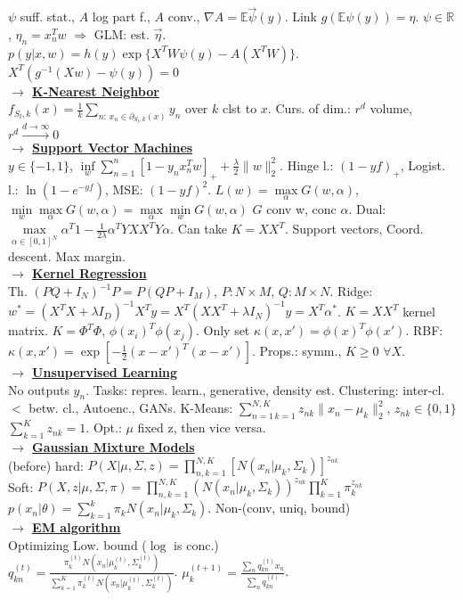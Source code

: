 \documentclass[12pt]{article}
\newcommand{\mytitle}[1]{ {\bf $\rightarrow$ \underline{#1}}\\}
\begin{document}
\begin{multicols*}{2}
$\psi$ suff. stat., $A$ log part f.,
$A$ conv., $\nabla A=\mathbb{E}\vec{\psi}(y)$. Link $g(\mathbb{E}\psi(y))=\eta$.
$\psi\in \mathbb{R}$, $\eta_n=x_n^Tw$ $\Rightarrow$ GLM: est. $\vec{\eta}$.
$p(y|x,w)=h(y)\exp\{X^TW\psi(y)-A(X^TW)\}$.
$X^T(g^{-1}(Xw)-\psi(y))=0$\\
\mytitle{K-Nearest Neighbor}
$f_{S_t,k}(x)=\frac{1}{k}\sum\limits_{n\colon\,x_n\in \partial_{S_t,k}(x)}y_n$ over $k$ clst to $x$.
Curs. of dim.: $r^d$ volume, $r^d\overset{d\to\infty}\to 0$\\
\mytitle{Support Vector Machines}
$y\in\{-1,1\}$, $\inf\limits_w\sum\limits_{n=1}^n\left[1-y_nx_n^Tw\right]_++\frac{\lambda}{2}\|w\|^2_2$.
Hinge l.: $(1-yf)_+$, Logist. l.: $\ln(1-e^{-yf})$, MSE: $(1-yf)^2$.
$L(w)=\max\limits_\alpha G(w,\alpha)$, $\min\limits_w\max\limits_\alpha G(w,\alpha)=\max\limits_\alpha\min\limits_w G(w,\alpha)$
$G$ conv w, conc $\alpha$.
Dual: $\max\limits_{\alpha\in[0,1]^N}\alpha^T1-\frac{1}{2\lambda}\alpha^TYXX^TY\alpha$.
Can take $K=XX^T$. Support vectors, Coord. descent. Max margin.\\
\mytitle{Kernel Regression}
Th. $(PQ+I_N)^{-1}P=P(QP+I_M)$, $P\colon N\times M$, $Q\colon M\times N$.
Ridge: $w^*=(X^TX+\lambda I_D)^{-1}X^Ty=X^T(XX^T+\lambda I_N)^{-1}y=X^T\alpha^*$.
$K=XX^T$ kernel matrix. $K=\Phi^T\Phi$, $\phi(x_i)^T\phi(x_j)$.
Only set $\kappa(x,x')=\phi(x)^T\phi(x')$.
RBF: $\kappa(x,x')=\exp\left[-\frac{1}{2}(x-x')^T(x-x')\right]$.
Props.: symm., $K\geqslant 0$ $\forall X$.\\
\mytitle{Unsupervised Learning}
No outputs $y_n$. Tasks: repres. learn., generative, density est.
Clustering: inter-cl. $<$ betw. cl., Autoenc., GANs.
K-Means: $\sum\limits_{n=1\,k=1}^{N,K}z_{nk}\|x_n-\mu_k\|_2^2$, $z_{nk}\in\{0,1\}$
$\sum\limits_{k=1}^Kz_{nk}=1$. Opt.: $\mu$ fixed z, then vice versa.\\
\mytitle{Gaussian Mixture Models}
(before) hard: $P(X|\mu,\Sigma,z)=\prod\limits_{n,k=1}^{N,K}\left[N(x_n|\mu_k,\Sigma_k)\right]^{z_{nk}}$\\
Soft: $P(X,z|\mu,\Sigma,\pi)=\prod\limits_{n,k=1}^{N,K}(N(x_n|\mu_k,\Sigma_k))^{z_{nk}}\prod\limits_{k=1}^K\pi_k^{z_{nk}}$\\
$p(x_n|\theta)=\sum\limits_{k=1}^k\pi_kN(x_n|\mu_k,\Sigma_k)$.
Non-(conv, uniq, bound)\\
\mytitle{EM algorithm}
Optimizing Low. bound ($\log$ is conc.)\\
$q_{kn}^{(t)}=\frac{\pi_k^{(t)}N(x_n|\mu_k^{(t)},\Sigma_k^{(t)})}{\sum\limits_{k=1}^K\pi_k^{(t)}N(x_n|\mu_k^{(t)},\Sigma_k^{(t)})}$.
$\mu_k^{(t+1)}=\frac{\sum_nq_{kn}^{(t)}x_n}{\sum_n q_{kn}^{(t)}}$.

\end{multicols*}
\end{document}
